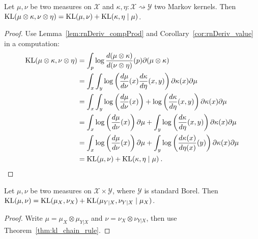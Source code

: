 \begin{theorem}
  \label{thm:kl_chain_rule}
  Let $\mu, \nu$ be two measures on $\mathcal X$ and $\kappa, \eta : \mathcal X \rightsquigarrow \mathcal Y$ two Markov kernels.
  Then $\mathrm{KL}(\mu \otimes \kappa, \nu \otimes \eta) = \mathrm{KL}(\mu, \nu) + \mathrm{KL}(\kappa, \eta \mid \mu)$.
\end{theorem}

\begin{proof}
Use Lemma~\ref{lem:rnDeriv_compProd} and Corollary~\ref{cor:rnDeriv_value} in a computation:
\begin{align*}
\mathrm{KL}(\mu \otimes \kappa, \nu \otimes \eta)
&= \int_p \log \frac{d(\mu \otimes \kappa)}{d(\nu \otimes \eta)}(p) \partial (\mu \otimes \kappa)
\\
&= \int_x \int_y\log \left(\frac{d\mu}{d \nu}(x)\frac{d\kappa}{d \eta}(x,y)\right) \partial \kappa(x) \partial\mu
\\
&= \int_x \int_y\log \left(\frac{d\mu}{d \nu}(x)\right) + \log \left(\frac{d\kappa}{d \eta}(x,y)\right) \partial \kappa(x) \partial\mu
\\
&= \int_x \log \left(\frac{d\mu}{d \nu}(x)\right)\partial\mu + \int_y\log \left(\frac{d\kappa}{d \eta}(x,y)\right) \partial \kappa(x) \partial\mu
\\
&= \int_x \log \left(\frac{d\mu}{d \nu}(x)\right)\partial\mu + \int_y\log \left(\frac{d\kappa(x)}{d \eta(x)}(y)\right) \partial \kappa(x) \partial\mu
\\
&= \mathrm{KL}(\mu, \nu) + \mathrm{KL}(\kappa, \eta \mid \mu)
\: .
\end{align*}

\end{proof}

\begin{theorem}
  \label{thm:kl_chain_rule_prod}
  Let $\mu, \nu$ be two measures on $\mathcal X \times \mathcal Y$, where $\mathcal Y$ is standard Borel.
  Then $\mathrm{KL}(\mu, \nu) = \mathrm{KL}(\mu_X, \nu_X) + \mathrm{KL}(\mu_{Y|X}, \nu_{Y|X} \mid \mu_X)$.
\end{theorem}

\begin{proof}
Write $\mu = \mu_X \otimes \mu_{Y|X}$ and $\nu = \nu_X \otimes \nu_{Y|X}$, then use Theorem~\ref{thm:kl_chain_rule}.
\end{proof}

